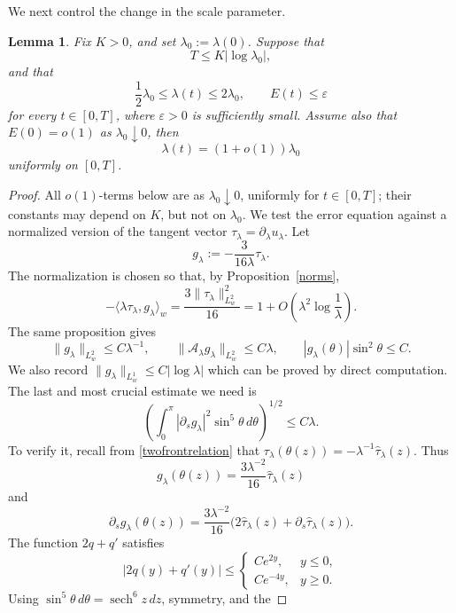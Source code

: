 \documentclass[11pt,a4paper]{article}
\DeclareMathOperator{\sech}{sech}
\numberwithin{equation}{section}
\theoremstyle{plain}
\newtheorem{lemma}[theorem]{Lemma}
\theoremstyle{remark}
\begin{document}
We next control the change in the scale parameter.

\begin{lemma}
\label{logscaledrift}
Fix $K>0$, and set $\lambda_0:=\lambda(0)$. Suppose that
$$
T\leq K\left|\log\lambda_0\right|,
$$
and that
$$
\frac12\lambda_0\leq\lambda(t)\leq2\lambda_0,
\qquad
E(t)\leq\varepsilon
$$
for every $t\in[0,T]$, where $\varepsilon>0$ is sufficiently
small. Assume also that $E(0)=o(1)$ as $\lambda_0\downarrow0$, then
$$
\lambda(t)=(1+o(1))\lambda_0
$$
uniformly on $[0,T]$.
\end{lemma}
\begin{proof}
All $o(1)$-terms below are as $\lambda_0\downarrow0$, uniformly
for $t\in[0,T]$; their constants may depend on $K$, but not on
$\lambda_0$. We test the error equation against a normalized version of the
tangent vector $\tau_\lambda=\partial_\lambda u_\lambda$. Let
$$
g_\lambda:=-\frac{3}{16\lambda}\tau_\lambda.
$$
The normalization is chosen so that, by Proposition~\ref{norms},
\begin{equation}\label{logpairing}
-\langle\lambda\tau_\lambda,g_\lambda\rangle_w
=
\frac{3\|\tau_\lambda\|_{L_w^2}^2}{16}
=
1+O\left(\lambda^2\log\frac1\lambda\right).
\end{equation}
The same proposition gives
\begin{equation}\label{gests}
\|g_\lambda\|_{L_w^2}\leq C\lambda^{-1},
\qquad
\|\mathcal A_\lambda g_\lambda\|_{L_w^2}\leq C\lambda,
\qquad
|g_\lambda(\theta)|\sin^2\theta\leq C.
\end{equation}
We also record $\|g_\lambda\|_{L_w^1}\leq C\left|\log\lambda\right|$ which can be proved by direct computation. The last and most crucial estimate we need is
\begin{equation}\label{partialsbound}
\left(
\int_0^\pi
|\partial_sg_\lambda|^2\sin^5\theta\,d\theta
\right)^{1/2}
\leq C\lambda.
\end{equation}
To verify it, recall from \eqref{twofrontrelation} that $\tau_\lambda(\theta(z))
=
-\lambda^{-1}\widehat{\tau}_\lambda(z)$. Thus
$$
g_\lambda(\theta(z))=\frac{3\lambda^{-2}}{16}\widehat{\tau}_\lambda(z)
$$
and
$$
\partial_sg_\lambda(\theta(z))
=
\frac{3\lambda^{-2}}{16}
\bigl(2\widehat{\tau}_\lambda(z)+\partial_s\widehat{\tau}_\lambda(z)\bigr).
$$
The function $2q+q'$ satisfies
$$
|2q(y)+q'(y)|
\leq
\begin{cases}
Ce^{2y},&y\leq0,\\
Ce^{-4y},&y\geq0.
\end{cases}
$$
Using $\sin^5\theta\,d\theta=\sech^6z\,dz$, symmetry, and the

\end{proof}
\end{document}
